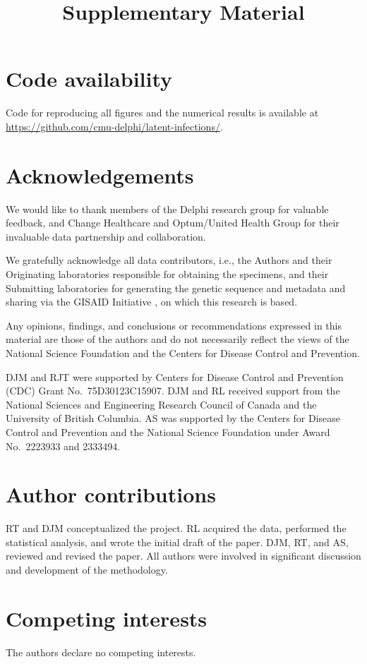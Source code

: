 \documentclass{article}
\newcommand{\beginsupplement}{
  \setcounter{table}{0}  
  \renewcommand{\thetable}{S\arabic{table}} 
  \renewcommand{\theHtable}{S\arabic{table}} 
  \setcounter{figure}{0} 
  \renewcommand{\thefigure}{S\arabic{figure}}
    \renewcommand{\theHfigure}{S\arabic{figure}} 
  \setcounter{section}{0} 
  \renewcommand{\thesection}{S\arabic{section}}
}
\begin{document}
\section*{Code availability}
Code for reproducing all figures and the numerical results is 
available at 
\href{https://github.com/cmu-delphi/latent-infections/}{https://github.com/cmu-delphi/latent-infections/}.

\clearpage
%




\section*{Acknowledgements}

We would like to thank members of the Delphi research group for valuable
feedback, and Change Healthcare and Optum/United Health Group for their
invaluable data partnership and collaboration. 

We gratefully acknowledge all
data contributors, i.e., the Authors and their Originating laboratories
responsible for obtaining the specimens, and their Submitting laboratories for
generating the genetic sequence and metadata and sharing via the GISAID
Initiative \citep{elbe2017data}, on which this research is based.

Any opinions, findings, and
conclusions or recommendations expressed in this material are
those of the authors and do not necessarily reflect the views of
the National Science Foundation and the Centers for Disease
Control and Prevention.

DJM and RJT were supported by Centers for Disease Control and Prevention (CDC)
Grant No.\ 75D30123C15907. DJM and RL received support from the National
Sciences and Engineering Research Council of Canada and the University of
British Columbia. AS was supported by the Centers for Disease Control
and Prevention and the National Science Foundation under
Award No.\ 2223933 and 2333494. 


\section*{Author contributions}
RT and DJM conceptualized the project. RL acquired the data, performed the
statistical analysis, and wrote the initial draft of the paper. DJM, RT, and AS,
reviewed and revised the paper. All authors were involved in significant
discussion and development of the methodology.

\section*{Competing interests}

The authors declare no competing interests.

\clearpage
\beginsupplement
\title{\supptitlefont\noindent Supplementary Material}
\maketitle


\end{document}
